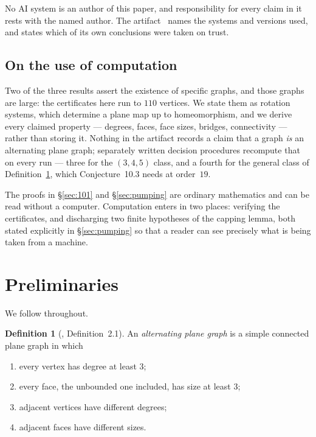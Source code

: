 \documentclass[11pt,a4paper]{amsart}
\theoremstyle{plain}
\theoremstyle{definition}
\newtheorem{definition}[theorem]{Definition}
\begin{document}

No AI system is an author of this paper, and responsibility for every claim in
it rests with the named author. The artifact~\cite{artifact} names the systems
and versions used, and states which of its own conclusions were taken on trust.

\subsection*{On the use of computation}

Two of the three results assert the existence of specific graphs, and those
graphs are large: the certificates here run to $110$ vertices. We state them as
rotation systems, which determine a plane map up to homeomorphism, and we derive
every claimed property --- degrees, faces, face sizes, bridges, connectivity ---
rather than storing it. Nothing in the artifact records a claim that a graph
\emph{is} an alternating plane graph; separately written decision procedures
recompute that on every run --- three for the $(3,4,5)$ class, and a fourth for
the general class of Definition~\ref{def:apg}, which Conjecture~10.3 needs at
order~$19$.

The proofs in \S\ref{sec:101} and \S\ref{sec:pumping} are ordinary mathematics
and can be read without a computer. Computation enters in two places: verifying
the certificates, and discharging two finite hypotheses of the capping lemma,
both stated explicitly in \S\ref{sec:pumping} so that a reader can see precisely
what is being taken from a machine.

\section{Preliminaries}\label{sec:prelim}

We follow \cite{AHSSV2015} throughout.

\begin{definition}[\cite{AHSSV2015}, Definition~2.1]\label{def:apg}
An \emph{alternating plane graph} is a simple connected plane graph in
which
\begin{enumerate}
  \item[(a)] every vertex has degree at least $3$;
  \item[(b)] every face, the unbounded one included, has size at least $3$;
  \item[(c)] adjacent vertices have different degrees;
  \item[(d)] adjacent faces have different sizes.
\end{enumerate}
\end{definition}
\end{document}

